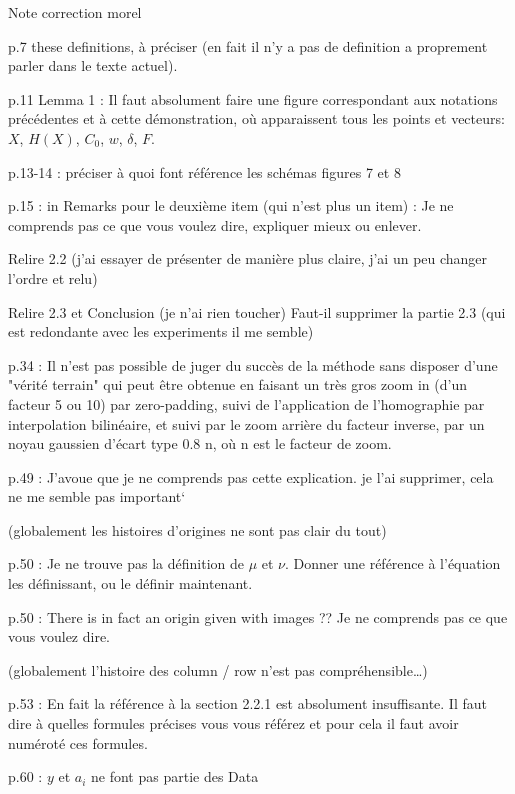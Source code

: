 Note correction morel

p.7 these definitions, à préciser (en fait il n’y a pas de definition a proprement parler dans le texte actuel).

p.11 Lemma 1 :  Il faut absolument faire une figure correspondant aux notations précédentes et à cette démonstration, où apparaissent tous  les points et vecteurs: $X$, $H(X)$, $C_0$, $w$, $\delta$, $F$.

p.13-14 : préciser à quoi font référence les schémas figures 7 et 8

p.15 : in Remarks pour le deuxième item (qui n’est plus un item) :  Je ne comprends pas ce que vous voulez dire, expliquer mieux ou enlever.

Relire 2.2 (j’ai essayer de présenter de manière plus claire, j’ai un peu changer l’ordre et relu)

Relire 2.3 et Conclusion (je n’ai rien toucher) 
Faut-il supprimer la partie 2.3 (qui est redondante avec les experiments il me semble)

p.34 : Il n'est pas possible de juger du succès de la méthode sans disposer d'une "vérité terrain" qui peut être obtenue en faisant un très gros zoom in (d'un facteur 5 ou 10) par zero-padding, suivi de l'application de l'homographie par interpolation bilinéaire, et suivi par le zoom arrière du facteur inverse, par un noyau gaussien d'écart type 0.8 n, où n est  le facteur de zoom.

p.49 : J'avoue que je ne comprends pas cette explication. 
je l’ai supprimer, cela ne me semble pas important`

(globalement les histoires d’origines ne sont pas clair du tout)

p.50 : Je ne trouve pas la définition de $\mu$ et $\nu$. Donner une référence à l'équation les définissant, ou le définir maintenant.

p.50 : There is in fact an origin given with images ?? Je ne comprends pas ce que vous voulez dire.

(globalement l’histoire des column / row n’est pas compréhensible…)

p.53 : En fait la référence à la section 2.2.1 est absolument insuffisante. Il faut dire à quelles formules précises vous vous référez et pour cela il faut avoir numéroté ces formules.

p.60 : $y$ et $a_i$ ne font pas partie des Data
